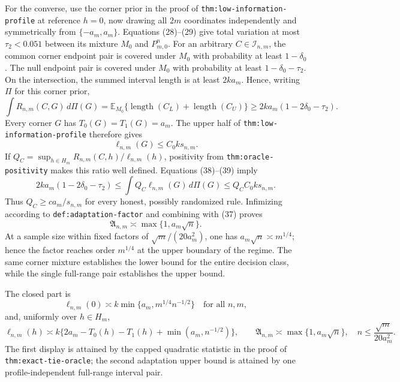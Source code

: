 For the converse, use the corner prior in the proof of
\texttt{thm:low-information-profile} at reference \(h=0\), now drawing all
\(2m\) coordinates independently and symmetrically from
\(\{-a_m,a_m\}\).  Equations (28)--(29) give total variation at most
\(\tau_2<0.051\) between its mixture \(M_0\) and \(P_{m,0}^n\).  For an
arbitrary \(C\in\mathcal I_{n,m}\), the common corner endpoint pair is
covered under \(M_0\) with probability at least \(1-\delta_0\).  The null
endpoint pair is covered under \(M_0\) with probability at least
\(1-\delta_0-\tau_2\).  On the intersection, the summed interval length is
at least \(2ka_m\).  Hence, writing \(\Pi\) for this corner prior,
\[
 \int R_{n,m}(C,G)\,d\Pi(G)
 =\mathbb E_{M_0}\{\operatorname{length}(C_L)+
                    \operatorname{length}(C_U)\}
 \ge2ka_m(1-2\delta_0-\tau_2).                                          \tag{38}
\]
Every corner \(G\) has \(T_0(G)=T_1(G)=a_m\).  The upper half of
\texttt{thm:low-information-profile} therefore gives
\[
 \ell_{n,m}(G)\le C_0k s_{n,m}.                                         \tag{39}
\]
If
\(Q_C=\sup_{h\in H_m}R_{n,m}(C,h)/\ell_{n,m}(h)\), positivity from
\texttt{thm:oracle-positivity} makes this ratio well defined.  Equations
(38)--(39) imply
\[
 2ka_m(1-2\delta_0-\tau_2)
 \le\int Q_C\ell_{n,m}(G)\,d\Pi(G)
 \le Q_CC_0ks_{n,m}.
\]
Thus \(Q_C\ge c a_m/s_{n,m}\) for every honest, possibly randomized rule.
Infimizing according to \texttt{def:adaptation-factor} and combining with
(37) proves
\[
 \mathfrak A_{n,m}\asymp\max\{1,a_m\sqrt n\}.
\]
At a sample size within fixed factors of
\(\sqrt m/(20a_m^2)\), one has
\(a_m\sqrt n\asymp m^{1/4}\); hence the factor reaches order
\(m^{1/4}\) at the upper boundary of the regime.  The same corner mixture
establishes the lower bound for the entire decision class, while the single
full-range pair establishes the upper bound.

The closed part is
\[
 \ell_{n,m}(0)\asymp k\min\{a_m,m^{1/4}n^{-1/2}\}
 \quad\text{for all }n,m,
\]
and, uniformly over \(h\in H_m\),
\[
 \ell_{n,m}(h)\asymp
 k\{2a_m-T_0(h)-T_1(h)+\min(a_m,n^{-1/2})\},\qquad
 \mathfrak A_{n,m}\asymp\max\{1,a_m\sqrt n\},
 \quad n\le\frac{\sqrt m}{20a_m^2}.
\]
The first display is attained by the capped quadratic statistic in the proof
of \texttt{thm:exact-tie-oracle}; the second adaptation upper bound is
attained by one profile-independent full-range interval pair.


